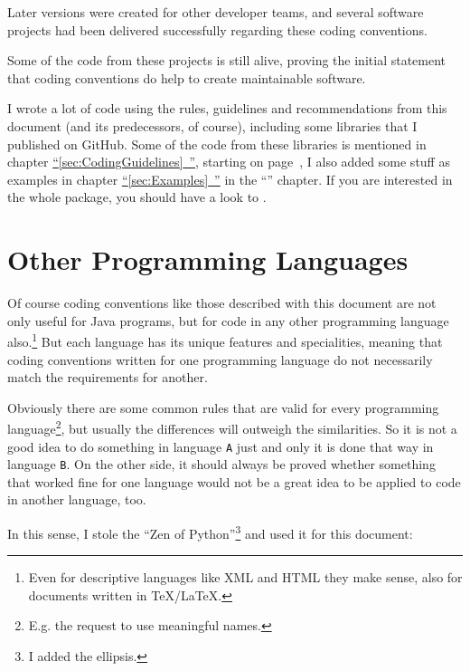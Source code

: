 \documentclass[11pt,a4paper, titlepage, parskip=half, headsepline, footsepline, cleardoublepage=current, headheight=1cm]{scrbook}
\newcommand*{\tqfullref}[1]{\hyperref[{#1}]{“\ref*{#1}~\nameref*{#1}”}}
\begin{document}
Later versions were created for other developer teams, and several software projects had been delivered successfully regarding these coding conventions.

Some of the code from these projects is still alive, proving the initial statement that coding conventions do help to create maintainable software.

I wrote a lot of code using the rules, guidelines and recommendations from this document (and its predecessors, of course), including some libraries that I published on GitHub. Some of the code from these libraries is mentioned in chapter \tqfullref{sec:CodingGuidelines}, starting on page~\pageref{sec:CodingGuidelines}, I also added some stuff as examples in chapter \tqfullref{sec:Examples} in the “” chapter. If you are interested in the whole package, you should have a look to \autocite{TQUADRAT_ORG}.

\section{Other Programming Languages}\label{sec:OtherProgrammingLanguages}
Of course coding conventions like those described with this document are not only useful for Java programs, but for code in any other programming language also.\footnote{Even for descriptive languages like XML and HTML they make sense, also for documents written in \TeX/\LaTeX.} But each language has its unique features and specialities, meaning that coding conventions written for one programming language do not necessarily match the requirements for another.

Obviously there are some common rules that are valid for every programming language\footnote{E.g. the request to use meaningful names.}, but usually the differences will outweigh the similarities. So it is not a good idea to do something in language \verb#A# just and only it is done that way in language \verb#B#. On the other side, it should always be proved whether something that worked fine for one language would not be a great idea to be applied to code in another language, too.

In this sense, I stole the “Zen of Python”\autocite{WIKIPEDIA:ZenOfPython,PYTHON_ORG_MAILING_LIST:ThePythonWay}\footnote{I added the ellipsis.} and used it for this document:
\end{document}
